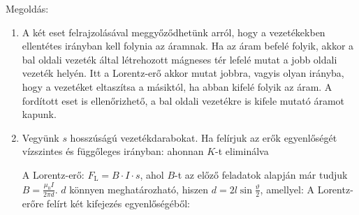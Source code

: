 
\ifdefined\megoldas

 Megoldás: 
 
 
 \begin{enumerate}[label=\alph*),itemsep=0pt]
  \item
   A két eset felrajzolásával meggyőződhetünk arról, hogy a vezetékekben ellentétes irányban kell folynia az áramnak. Ha az áram befelé folyik, akkor a bal oldali vezeték által létrehozott mágneses tér lefelé mutat a jobb oldali vezeték helyén. Itt a Lorentz-erő akkor mutat jobbra, vagyis olyan irányba, hogy a vezetéket eltaszítsa a másiktól, ha abban kifelé folyik az áram. A fordított eset is ellenőrizhető, a bal oldali vezetékre is kifele mutató áramot kapunk.
  \item
   Vegyünk $s$ hosszúságú vezetékdarabokat. Ha felírjuk az erők egyenlőségét vízszintes és függőleges irányban:
   ahonnan $K$-t eliminálva
   
   A Lorentz-erő: $F_\text{L}=B\cdot I\cdot s$, ahol $B$-t az előző feladatok alapján már tudjuk $B=\frac{\mu_0 I}{2\pi d}$. $d$ könnyen meghatározható, hiszen $d=2l\sin\frac{\vartheta}{2}$, amellyel:
   A Lorentz-erőre felírt két kifejezés egyenlőségéből:
 \end{enumerate}

 \fi